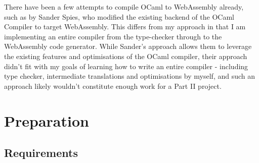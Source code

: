 \documentclass[12pt,twoside,notitlepage]{report}
\begin{document}
There have been a few attempts to compile OCaml to WebAssembly already, such as by Sander Spies\cite{Awbfo}, who modified the existing backend of the OCaml Compiler to target WebAssembly. This differs from my approach in that I am implementing an entire compiler from the type-checker through to the WebAssembly code generator. While Sander's approach allows them to leverage the existing features and optimisations of the OCaml compiler, their approach didn't fit with my goals of learning how to write an entire compiler - including type checker, intermediate translations and optimisations by myself, and such an approach likely wouldn't constitute enough work for a Part II project.


\clearpage



\chapter{Preparation}





\section{Requirements}
\end{document}
